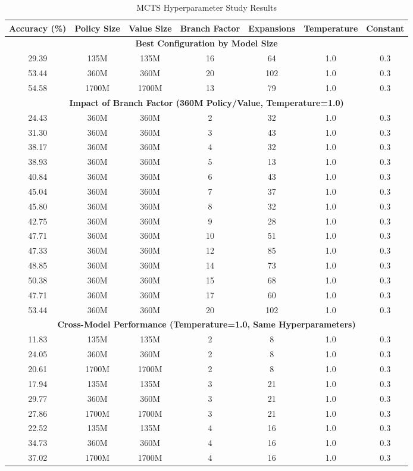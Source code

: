 \documentclass{article}
\begin{document}
\begin{table}[H]
\centering
\caption{MCTS Hyperparameter Study Results}
\label{tab:appendix-hyperparams}
\small
\begin{tabular}{ccccccc}
\toprule
\textbf{Accuracy (\%)} & \textbf{Policy Size} & \textbf{Value Size} & \textbf{Branch Factor} & \textbf{Expansions} & \textbf{Temperature} & \textbf{Constant} \\
\midrule
\multicolumn{7}{c}{\textbf{Best Configuration by Model Size}} \\
\midrule
29.39 & 135M & 135M & 16 & 64 & 1.0 & 0.3 \\
53.44 & 360M & 360M & 20 & 102 & 1.0 & 0.3 \\
54.58 & 1700M & 1700M & 13 & 79 & 1.0 & 0.3 \\
\midrule
\multicolumn{7}{c}{\textbf{Impact of Branch Factor (360M Policy/Value, Temperature=1.0)}} \\
\midrule
24.43 & 360M & 360M & 2 & 32 & 1.0 & 0.3 \\
31.30 & 360M & 360M & 3 & 43 & 1.0 & 0.3 \\
38.17 & 360M & 360M & 4 & 32 & 1.0 & 0.3 \\
38.93 & 360M & 360M & 5 & 13 & 1.0 & 0.3 \\
40.84 & 360M & 360M & 6 & 43 & 1.0 & 0.3 \\
45.04 & 360M & 360M & 7 & 37 & 1.0 & 0.3 \\
45.80 & 360M & 360M & 8 & 32 & 1.0 & 0.3 \\
42.75 & 360M & 360M & 9 & 28 & 1.0 & 0.3 \\
47.71 & 360M & 360M & 10 & 51 & 1.0 & 0.3 \\
47.33 & 360M & 360M & 12 & 85 & 1.0 & 0.3 \\
48.85 & 360M & 360M & 14 & 73 & 1.0 & 0.3 \\
50.38 & 360M & 360M & 15 & 68 & 1.0 & 0.3 \\
47.71 & 360M & 360M & 17 & 60 & 1.0 & 0.3 \\
53.44 & 360M & 360M & 20 & 102 & 1.0 & 0.3 \\
\midrule
\multicolumn{7}{c}{\textbf{Cross-Model Performance (Temperature=1.0, Same Hyperparameters)}} \\
\midrule
11.83 & 135M & 135M & 2 & 8 & 1.0 & 0.3 \\
24.05 & 360M & 360M & 2 & 8 & 1.0 & 0.3 \\
20.61 & 1700M & 1700M & 2 & 8 & 1.0 & 0.3 \\
\midrule
17.94 & 135M & 135M & 3 & 21 & 1.0 & 0.3 \\
29.77 & 360M & 360M & 3 & 21 & 1.0 & 0.3 \\
27.86 & 1700M & 1700M & 3 & 21 & 1.0 & 0.3 \\
\midrule
22.52 & 135M & 135M & 4 & 16 & 1.0 & 0.3 \\
34.73 & 360M & 360M & 4 & 16 & 1.0 & 0.3 \\
37.02 & 1700M & 1700M & 4 & 16 & 1.0 & 0.3 \\
\bottomrule
\end{tabular}
\end{table}
\end{document}
